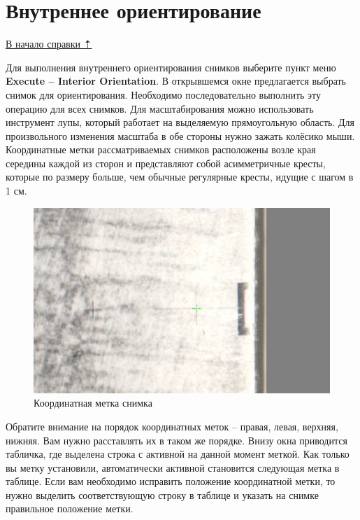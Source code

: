 \documentclass[
  12pt,
]{book}
\begin{document}
\hypertarget{stereo-interior}{%
\section{Внутреннее ориентирование}\label{stereo-interior}}

\protect\hyperlink{stereo}{В начало справки ⇡}

Для выполнения внутреннего ориентирования снимков выберите пункт меню \textbf{Execute -- Interior Orientation}. В открывшемся окне предлагается выбрать снимок для ориентирования. Необходимо последовательно выполнить эту операцию для всех снимков. Для масштабирования можно использовать инструмент лупы, который работает на выделяемую прямоугольную область. Для произвольного изменения масштаба в обе стороны нужно зажать колёсико мыши. Координатные метки рассматриваемых снимков расположены возле края середины каждой из сторон и представляют собой асимметричные кресты, которые по размеру больше, чем обычные регулярные кресты, идущие с шагом в 1 см.

\begin{figure}
\centering
\includegraphics{images/Ref13/Mark.png}
\caption{Координатная метка снимка}
\end{figure}

Обратите внимание на порядок координатных меток -- правая, левая, верхняя, нижняя. Вам нужно расставлять их в таком же порядке. Внизу окна приводится табличка, где выделена строка с активной на данной момент меткой. Как только вы метку установили, автоматически активной становится следующая метка в таблице. Если вам необходимо исправить положение координатной метки, то нужно выделить соответствующую строку в таблице и указать на снимке правильное положение метки.
\end{document}
